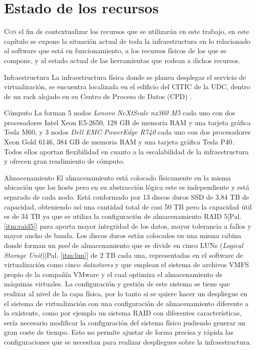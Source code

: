 \chapter{Estado de los recursos}
\label{chap:estado-recursos-CITIC-VCF}

\lettrine{C}{on} el fin de contextualizar los recursos que se utilizarán en este trabajo, en este capítulo se expone la situación actual de toda la infraestructura en lo relacionado al software que está en funcionamiento, a los recursos físicos de los que se compone, y al estado actual de las herramientas que rodean a dichos recursos.

\begin{section}{Infraestructura}
La infraestructura física donde se planea desplegar el servicio de virtualización, se encuentra localizada en el edificio del CITIC de la UDC, dentro de un rack alojado en su Centro de Proceso de Datos (CPD) \cite{citicUDC}. 
\begin{subsection}{Cómputo}
    La forman 5 nodos \textit{Lenovo NeXtScale nx360 M5} cada uno con dos procesadores Intel Xeon E5-2650, 128 GB de memoria RAM y una tarjeta gráfica Tesla M60,  y 3 nodos \textit{Dell EMC PowerEdge R740} cada uno con dos procesadores Xeon Gold 6146, 384 GB de memoria RAM y una tarjeta gráfica Tesla P40. Todos ellos aportan flexibilidad en cuanto a la escalabilidad de la infraestructura y ofrecen gran rendimiento de cómputo.
\end{subsection}
\begin{subsection}{Almacenamiento}
    El almacenamiento está colocado físicamente en la misma ubicación que los hosts pero en su abstracción lógica este es independiente y está separado de cada nodo. Está conformado por 13 discos duros SSD de 3.84 TB de capacidad, obteniendo así una cantidad total de casi 50 TB pero la capacidad útil es de 34 TB ya que se utiliza la configuración de almacenamiento RAID 5[Pal. \ref{itm:raid5}] para aporta mayor  integridad de los datos, mayor tolerancia a fallos y mayor ancho de banda. Los discos duros están colocados en una misma cabina donde forman un \textit{pool} de almacenamiento que se divide en cinco LUNs (\textit{Logical Storage Unit})[Pal. \ref{itm:lun}] de 2 TB cada una, representadas en el software de virtualización como cinco \textit{datastores} y que emplean el sistema de archivos VMFS propio de la compañía VMware y el cual optimiza el almacenamiento de máquinas virtuales.
    La configuración y gestión de este sistema se tiene que realizar al nivel de la capa física, por lo tanto si se quiere hacer un despliegue en el sistema de virtualización con una configuración de almacenamiento diferente a la existente, como por ejemplo un sistema RAID con diferentes características, sería necesario modificar la configuración del sistema físico pudiendo generar un gran coste de tiempo. Esto no permite ajustar de forma precisa y rápida las configuraciones que se necesitan para realizar despliegues sobre la infraestructura.
\end{subsection}


\end{section}
